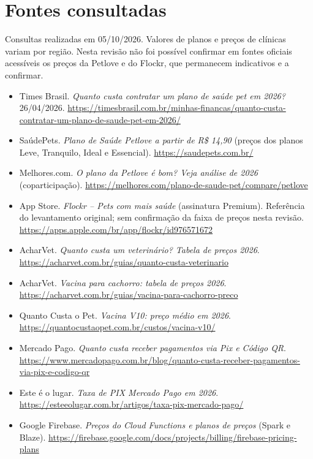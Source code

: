 \section*{Fontes consultadas}

Consultas realizadas em 05/10/2026. Valores de planos e preços de clínicas variam por
região.
Nesta revisão não foi possível confirmar em fontes oficiais acessíveis os preços da Petlove
e do Flockr, que permanecem indicativos e a confirmar.

\begin{itemize}[leftmargin=1.2em, itemsep=4pt]
  \item Times Brasil. \emph{Quanto custa contratar um plano de saúde pet em 2026?} 26/04/2026.
  \url{https://timesbrasil.com.br/minhas-financas/quanto-custa-contratar-um-plano-de-saude-pet-em-2026/}
  \item SaúdePets. \emph{Plano de Saúde Petlove a partir de R\$ 14,90} (preços dos planos Leve,
  Tranquilo, Ideal e Essencial). \url{https://saudepets.com.br/}
  \item Melhores.com. \emph{O plano da Petlove é bom? Veja análise de 2026} (coparticipação).
  \url{https://melhores.com/plano-de-saude-pet/compare/petlove}
  \item App Store. \emph{Flockr -- Pets com mais saúde} (assinatura Premium).
  Referência do levantamento original; sem confirmação da faixa de preços nesta revisão.
  \url{https://apps.apple.com/br/app/flockr/id976571672}
  \item AcharVet. \emph{Quanto custa um veterinário? Tabela de preços 2026}.
  \url{https://acharvet.com.br/guias/quanto-custa-veterinario}
  \item AcharVet. \emph{Vacina para cachorro: tabela de preços 2026}.
  \url{https://acharvet.com.br/guias/vacina-para-cachorro-preco}
  \item Quanto Custa o Pet. \emph{Vacina V10: preço médio em 2026}.
  \url{https://quantocustaopet.com.br/custos/vacina-v10/}
  \item Mercado Pago. \emph{Quanto custa receber pagamentos via Pix e Código QR}.
  \url{https://www.mercadopago.com.br/blog/quanto-custa-receber-pagamentos-via-pix-e-codigo-qr}
  \item Este é o lugar. \emph{Taxa de PIX Mercado Pago em 2026}.
  \url{https://esteeolugar.com.br/artigos/taxa-pix-mercado-pago/}
  \item Google Firebase. \emph{Preços do Cloud Functions e planos de preços} (Spark e Blaze).
  \url{https://firebase.google.com/docs/projects/billing/firebase-pricing-plans}

\end{itemize}
